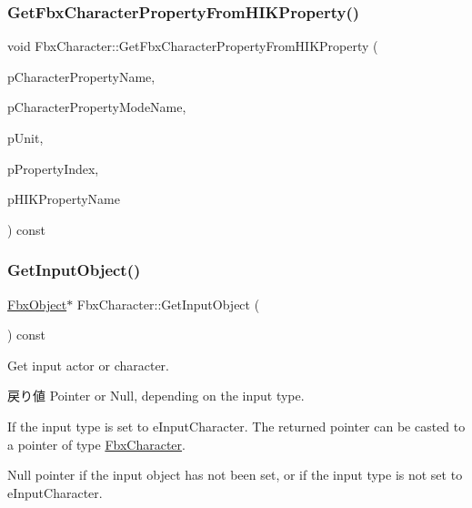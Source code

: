 \subsubsection{\texorpdfstring{Get\+Fbx\+Character\+Property\+From\+H\+I\+K\+Property()}{GetFbxCharacterPropertyFromHIKProperty()}}
{\footnotesize\ttfamily void Fbx\+Character\+::\+Get\+Fbx\+Character\+Property\+From\+H\+I\+K\+Property (\begin{DoxyParamCaption}\item[{char $\ast$\&}]{p\+Character\+Property\+Name,  }\item[{char $\ast$\&}]{p\+Character\+Property\+Mode\+Name,  }\item[{\hyperlink{class_fbx_character_aa48fb13a1c63e6a69ce9fa251993f8d5}{E\+Property\+Unit} \&}]{p\+Unit,  }\item[{int \&}]{p\+Property\+Index,  }\item[{const char $\ast$}]{p\+H\+I\+K\+Property\+Name }\end{DoxyParamCaption}) const}

\mbox{\label{class_fbx_character_ab5c94f8151be5c32de9ac489e42e6a43}} 
\subsubsection{\texorpdfstring{Get\+Input\+Object()}{GetInputObject()}}
{\footnotesize\ttfamily \hyperlink{class_fbx_object}{Fbx\+Object}$\ast$ Fbx\+Character\+::\+Get\+Input\+Object (\begin{DoxyParamCaption}{ }\end{DoxyParamCaption}) const}

Get input actor or character. \begin{DoxyReturn}{戻り値}
Pointer or {\ttfamily Null}, depending on the input type.
\begin{DoxyItemize}
\item If the input type is set to e\+Input\+Character. The returned pointer can be casted to a pointer of type \hyperlink{class_fbx_character}{Fbx\+Character}.
\item {\ttfamily Null} pointer if the input object has not been set, or if the input type is not set to e\+Input\+Character. 
\end{DoxyItemize}
\end{DoxyReturn}
\mbox{\label{class_fbx_character_ae4404d380579722e4297cee338e5c33c}} 
